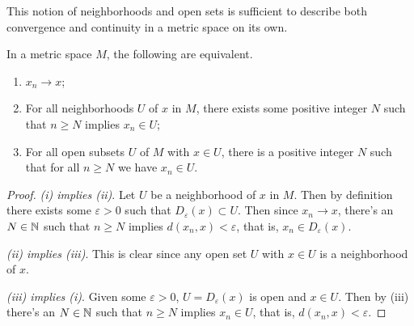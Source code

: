 \documentclass[a4paper]{scrartcl}
\begin{document}
This notion of neighborhoods and open sets is sufficient to describe both convergence and continuity in a metric space on its own.

\begin{proposition}
    In a metric space $M$, the following are equivalent.
    \begin{enumerate}[label=(\roman*)]
        \item $x_n \rightarrow x$;
        \item For all neighborhoods $U$ of $x$ in $M$, there exists some positive integer $N$ such that $n \geq N$ implies $x_n \in U$;
        \item For all open subsets $U$ of $M$ with $x \in U$, there is a positive integer $N$ such that for all $n \geq N$ we have $x_n \in U$.
    \end{enumerate}
\end{proposition}
\begin{proof}
    \emph{(i) implies (ii)}. Let $U$ be a neighborhood of $x$ in $M$. Then by definition there exists some $\varepsilon > 0$ such that $D_{\varepsilon}(x) \subset U$. Then since $x_n \rightarrow x$, there's an $N \in \mathbb{N}$ such that $n \geq N$ implies $d(x_n, x) < \varepsilon$, that is, $x_n \in D_{\varepsilon}(x)$.

    \emph{(ii) implies (iii)}. This is clear since any open set $U$ with $x \in U$ is a neighborhood of $x$.

    \emph{(iii) implies (i)}. Given some $\varepsilon > 0$, $U = D_{\varepsilon}(x)$ is open and $x \in U$. Then by (iii) there's an $N \in \mathbb{N}$ such that $n \geq N$ implies $x_n \in U$, that is, $d(x_n, x) < \varepsilon$.
\end{proof}
\end{document}
